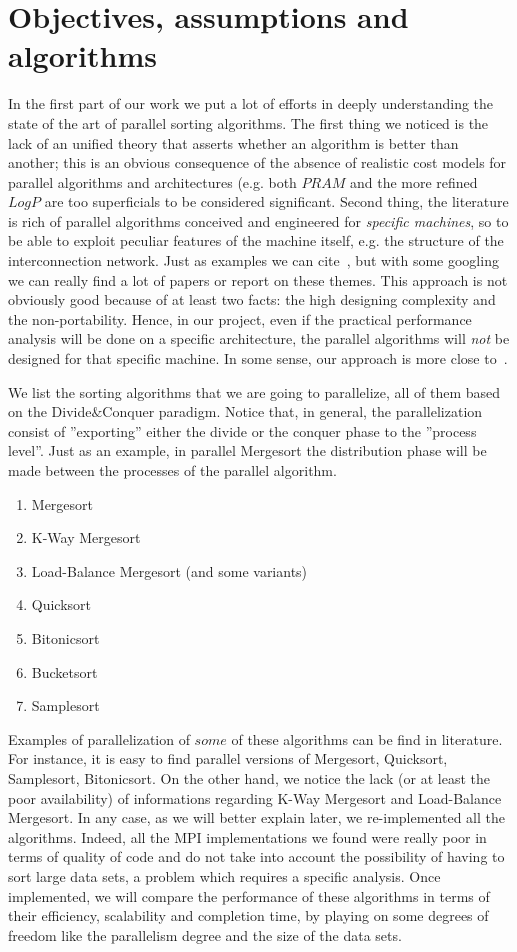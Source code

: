 \section{Objectives, assumptions and algorithms}
\label{assumptions}
In the first part of our work we put a lot of efforts in deeply understanding the state of the art of parallel sorting algorithms. The first thing we noticed is the lack of an unified theory that asserts whether an algorithm is better than another; this is an obvious consequence of the absence of realistic cost models for parallel algorithms and architectures (e.g. both $PRAM$ and the more refined $LogP$ are too superficials to be considered significant. Second thing, the literature is rich of parallel algorithms conceived and engineered for \textit{specific machines}, so to be able to exploit peculiar features of the machine itself, e.g. the structure of the interconnection network. Just as examples we can cite~\cite{CSPA, CSPA2}, but with some googling we can really find a lot of papers or report on these themes. This approach is not obviously good because of at least two facts: the high designing complexity and the non-portability. Hence, in our project, even if the practical performance analysis will be done on a specific architecture, the parallel algorithms will \textit{not} be designed for that specific machine. In some sense, our approach is more close to~\cite{NPSA}.

We list the sorting algorithms that we are going to parallelize, all of them based on the Divide$\&$Conquer paradigm. Notice that, in general, the parallelization consist of ''exporting'' either the divide or the conquer phase to the ''process level''. Just as an example, in parallel Mergesort the distribution phase will be made between the processes of the parallel algorithm. 
\begin{enumerate}
\item Mergesort
\item K-Way Mergesort
\item Load-Balance Mergesort (and some variants) 
\item Quicksort
\item Bitonicsort
\item Bucketsort
\item Samplesort
\end{enumerate}
Examples of parallelization of $some$ of these algorithms can be find in literature. For instance, it is easy to find parallel versions of Mergesort, Quicksort, Samplesort, Bitonicsort. On the other hand, we notice the lack (or at least the poor availability) of informations regarding K-Way Mergesort and Load-Balance Mergesort. In any case, as we will better explain later, we re-implemented all the algorithms. Indeed, all the MPI implementations we found were really poor in terms of quality of code and do not take into account the possibility of having to sort large data sets, a problem which requires a specific analysis. Once implemented, we will compare the performance of these algorithms in terms of their efficiency, scalability and completion time, by playing on some degrees of freedom like the parallelism degree and the size of the data sets.  
 
